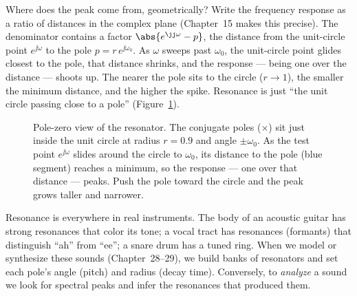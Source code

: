 \begin{whybox}
Where does the peak come from, geometrically? Write the frequency response as a
ratio of distances in the complex plane (Chapter~15 makes this precise). The
denominator contains a factor $\abs{e^{\jj\omega} - p}$, the distance from the
unit-circle point $e^{\jj\omega}$ to the pole $p = r\,e^{\jj\omega_0}$. As
$\omega$ sweeps past $\omega_0$, the unit-circle point glides closest to the
pole, that distance shrinks, and the response --- being one over the distance ---
shoots up. The nearer the pole sits to the circle ($r\to 1$), the smaller the
minimum distance, and the higher the spike. Resonance is just ``the unit circle
passing close to a pole'' (Figure~\ref{ch14:fig-polezero}).
\end{whybox}

\begin{figure}[H]
\centering
{}
\caption{Pole-zero view of the resonator. The conjugate poles ($\times$) sit just
inside the unit circle at radius $r=0.9$ and angle $\pm\omega_0$. As the test
point $e^{\jj\omega}$ slides around the circle to $\omega_0$, its distance to the
pole (blue segment) reaches a minimum, so the response --- one over that distance
--- peaks. Push the pole toward the circle and the peak grows taller and
narrower.}
\label{ch14:fig-polezero}
\end{figure}

\begin{applicationbox}
Resonance is everywhere in real instruments. The body of an acoustic guitar has
strong resonances that color its tone; a vocal tract has resonances (formants)
that distinguish ``ah'' from ``ee''; a snare drum has a tuned ring. When we
model or synthesize these sounds (Chapter~28--29), we build banks of resonators
and set each pole's angle (pitch) and radius (decay time). Conversely, to
\emph{analyze} a sound we look for spectral peaks and infer the resonances that
produced them.
\end{applicationbox}

